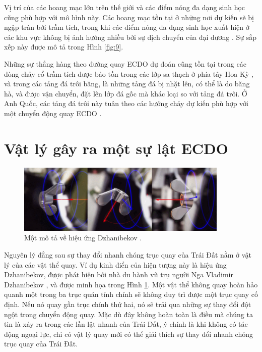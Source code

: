 \documentclass[10pt,twocolumn,letterpaper]{article}
\begin{document}
Vị trí của các hoang mạc lớn trên thế giới và các điểm nóng đa dạng sinh học cũng phù hợp với mô hình này. Các hoang mạc tồn tại ở những nơi dự kiến sẽ bị ngập tràn bởi trầm tích, trong khi các điểm nóng đa dạng sinh học xuất hiện ở các khu vực không bị ảnh hưởng nhiều bởi sự dịch chuyển của đại dương \cite{28}. Sự sắp xếp này được mô tả trong Hình \ref{fig:9}.

Những sự thẳng hàng theo đường quay ECDO dự đoán cũng tồn tại trong các dòng chảy cổ trầm tích được bảo tồn trong các lớp sa thạch ở phía tây Hoa Kỳ \cite{21}, và trong các tảng đá trôi băng, là những tảng đá bị nhặt lên, có thể là do băng hà, và được vận chuyển, đặt lên lớp đá gốc mà khác loại so với tảng đá trôi. Ở Anh Quốc, các tảng đá trôi này tuân theo các hướng chảy dự kiến phù hợp với một chuyển động quay ECDO \cite{67,68}.

\section{Vật lý gây ra một sự lật ECDO}

\begin{figure}
\begin{center}
\includegraphics[width=0.9\textwidth]{dzhani.jpg}
\end{center}
   \caption{Một mô tả về hiệu ứng Dzhanibekov \cite{28}.}
\label{fig:10}
\end{figure}

Nguyên lý đằng sau sự thay đổi nhanh chóng trục quay của Trái Đất nằm ở vật lý của các vật thể quay. Ví dụ kinh điển của hiện tượng này là hiệu ứng Dzhanibekov, được phát hiện bởi nhà du hành vũ trụ người Nga Vladimir Dzhanibekov \cite{37}, và được minh họa trong Hình \ref{fig:10}. Một vật thể không quay hoàn hảo quanh một trong ba trục quán tính chính sẽ không duy trì được một trục quay cố định. Nếu nó quay gần trục chính thứ hai, nó sẽ trải qua những sự thay đổi đột ngột trong chuyển động quay. Mặc dù đây không hoàn toàn là điều mà chúng ta tin là xảy ra trong các lần lật nhanh của Trái Đất, ý chính là khi không có tác động ngoại lực, chỉ có vật lý quay mới có thể giải thích sự thay đổi nhanh chóng trục quay của Trái Đất.
\end{document}
